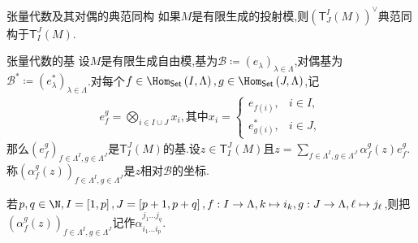 \begin{proposition}{张量代数及其对偶的典范同构}{}
	如果$M$是有限生成的投射模,则$\left(\mathsf{T}_{J}^{I}\left(M\right)\right)^{\vee}$典范同构于$\mathsf{T}_{I}^{J}\left(M\right)$.
\end{proposition}

\begin{definition}{张量代数的基}{}
	设$M$是有限生成自由模,基为$\mathcal{B}\coloneq\left(e_{\lambda}\right)_{\lambda\in\Lambda}$,对偶基为$\mathcal{B}^{\ast}\coloneq\left(e_{\lambda}^{\ast}\right)_{\lambda\in\Lambda}$.对每个$f\in\Hom_{\mathsf{Set}}\left(I,\Lambda\right),g\in\Hom_{\mathsf{Set}}\left(J,\Lambda\right)$,记
	\begin{align*}
		e_{f}^{g}=\bigotimes\limits_{i\in I\cup J}x_{i},\text{其中}x_{i}=
		\begin{cases}
			e_{f\left(i\right)},&i\in I,\\
			e_{g\left(i\right)}^{\ast},&i\in J,
		\end{cases}
	\end{align*}
	那么$\left(e_{f}^{g}\right)_{f\in\Lambda^{I},g\in\Lambda^{J}}$是$\mathsf{T}_{I}^{J}\left(M\right)$的基.设$z\in\mathsf{T}_{I}^{J}\left(M\right)$且$z=\sum\limits_{f\in\Lambda^{I},g\in\Lambda^{J}}\alpha_{f}^{g}\left(z\right)e_{f}^{g}$.称$\left(\alpha_{f}^{g}\left(z\right)\right)_{f\in\Lambda^{I},g\in\Lambda^{J}}$是$z$相对$\mathcal{B}$的坐标.
\end{definition}

\begin{remark}{}{}
	若$p,q\in\N,I=\left[1,p\right],J=\left[p+1,p+q\right],f:I\to\Lambda,k\mapsto i_{k},g:J\to\Lambda,\ell\mapsto j_{\ell}$,则把$\left(\alpha_{f}^{g}\left(z\right)\right)_{f\in\Lambda^{I},g\in\Lambda^{J}}$记作$\alpha_{i_{1}\ldots i_{p}}^{j_{1}\ldots j_{q}}$.
\end{remark}

